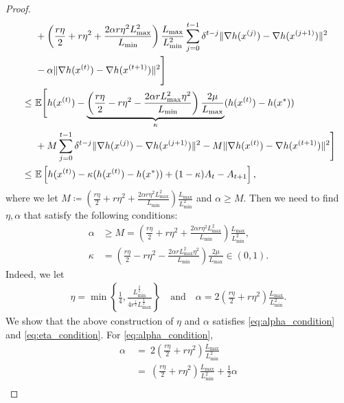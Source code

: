 \begin{proof}
\begin{equation}
\begin{split}
        &+ \left( \frac{r \eta}{2} + r \eta^2 + \frac{2 \alpha r \eta^2 L_{\max}^2}{ L_{\min} } \right) \frac{L_{\max}}{L_{\min}^2} \sum_{j=0}^{t-1} \delta^{t-j} \| \nabla h(x^{(j)}) - {\nabla} h(x^{(j+1)}) \|^2 \\
        &- \alpha \| \nabla h(x^{(t)}) - {\nabla} h(x^{(t+1)}) \|^2 \Bigg] \\
        ~\leq~& \mathbb{E}\Bigg[ h(x^{(t)}) - \underbrace{\left( \frac{r \eta }{2} - r \eta^2 - \frac{2 \alpha r L_{\max}^2 \eta^2}{L_{\min}} \right) \frac{2\mu}{ L_{\max}} }_{\kappa} ( h(x^{(t)}) - h(x^*) ) \\
        &+ M \sum_{j=0}^{t-1} \delta^{t-j} \| \nabla h(x^{(j)}) - {\nabla} h(x^{(j+1)}) \|^2 - M \| \nabla h(x^{(t)}) - {\nabla} h(x^{(t+1)}) \|^2 \Bigg] \\
        ~\leq~& \mathbb{E}\left[ h(x^{(t)}) - \kappa ( h(x^{(t)}) - h(x^*) ) + (1 - \kappa) A_t - A_{t+1} \right], 
    \end{split}
    \end{equation}
    where we let $M \coloneqq \left( \frac{r \eta}{2} + r \eta^2 + \frac{2 \alpha r \eta^2 L_{\max}^2}{ L_{\min} } \right) \frac{L_{\max}}{L_{\min}^2}$ and $\alpha \geq M$.
    Then we need to find $\eta, \alpha$ that satisfy the following conditions:
    \begin{align}
        \alpha &\geq M = \left( \frac{r \eta}{2} + r \eta^2 + \frac{2 \alpha r \eta^2 L_{\max}^2}{ L_{\min} } \right) \frac{L_{\max}}{L_{\min}^2}, \label{eq:alpha_condition} \\
        \kappa & = \left( \frac{r \eta }{2} - r \eta^2 - \frac{2 \alpha r L_{\max}^2 \eta^2}{L_{\min}} \right) \frac{2\mu}{ L_{\max}} \in (0,1). \label{eq:eta_condition}
    \end{align}
    Indeed, we let 
    \begin{align}
        \eta = \min \left\{ \frac{1}{4}, \frac{L_{\min}^{\frac{3}{2}}}{4 r^{\frac{1}{2}} L_{\max}^{\frac{3}{2}} } \right\} \quad \text{and} \quad \alpha = 2\left( \frac{r \eta}{2} + r \eta^2 \right) \frac{L_{\max}}{L_{\min}^2}. \label{eq:eta_alpha_def}
    \end{align}
    We show that the above construction of $\eta$ and $\alpha$ satisfies \eqref{eq:alpha_condition} and \eqref{eq:eta_condition}. For \eqref{eq:alpha_condition},
    \begin{align*}
        \alpha &~=~ 2\left( \frac{r \eta}{2} + r \eta^2 \right) \frac{L_{\max}}{L_{\min}^2}  \\
        & ~=~ \left( \frac{r \eta}{2} + r \eta^2 \right) \frac{L_{\max}}{L_{\min}^2} + \frac{1}{2} \alpha \\

\end{align*}
\end{proof}
